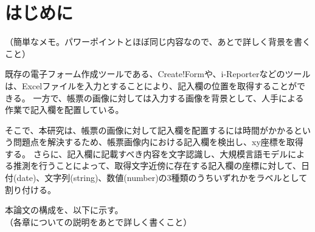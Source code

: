 \chapter{はじめに}\label{cha:Introduction}
（簡単なメモ。パワーポイントとほぼ同じ内容なので、あとで詳しく背景を書くこと）

既存の電子フォーム作成ツールである、Create!Form\cite{Create!Form}や、i-Reporter\cite{i-Reporter}などのツールは、Excelファイルを入力とすることにより、記入欄の位置を取得することができる。
一方で、帳票の画像に対しては入力する画像を背景として、人手による作業で記入欄を配置している。

そこで、本研究は、帳票の画像に対して記入欄を配置するには時間がかかるという問題点を解決するため、帳票画像内における記入欄を検出し、xy座標を取得する。
さらに、記入欄に記載すべき内容を文字認識し、大規模言語モデルによる推測を行うことによって、取得文字近傍に存在する記入欄の座標に対して、日付(date)、文字列(string)、数値(number)の3種類のうちいずれかをラベルとして割り付ける。

本論文の構成を、以下に示す。\\
  （各章についての説明をあとで詳しく書くこと）
